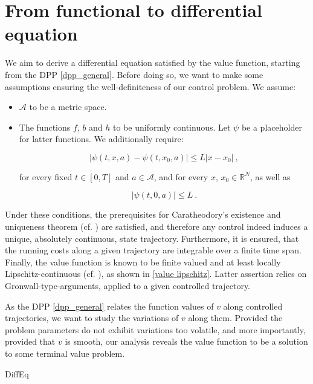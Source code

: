 
\section{From functional to differential equation}

We aim to derive a differential equation satisfied by the value function, starting from the DPP \eqref{dpp_general}. Before doing so, we want to make some assumptions ensuring the well-definiteness of our control problem. We assume:

	\begin{itemize}
		\item
		$ \mathcal{A} $ to be a metric space.
		
		\item The functions $ f $, $ b $ and $ h $ to be uniformly continuous. Let $ \psi $ be a placeholder for latter functions. We additionally require:
		
		\begin{equation}
			\label{Lipschitz}
			\lvert \psi(t, x, a) - \psi(t, x_0, a) \rvert \leq L \lvert x - x_0 \rvert \ ,
		\end{equation}
		
		for every fixed $ t \in \left[0, T \right] $ and $ a \in \mathcal{A} $, and for every $ x $, $ x_0 \in  \mathbb{R}^N $, as well as 
		
		\begin{equation}
			\label{bounded}
			\lvert \psi(t, 0, a) \rvert \leq L \ .
		\end{equation}
		
	\end{itemize}

Under these conditions, the prerequisites for  Caratheodory's existence and uniqueness theorem (cf. \cite[Theorem 1.45 p.~25]{roubivcek}) are satisfied, and therefore any control indeed induces a unique, absolutely continuous, state trajectory. Furthermore, it is ensured, that the running costs along a given trajectory are integrable over a finite time span. Finally, the value function is known to be finite valued and at least locally Lipschitz-continuous (cf. \cite[Inequality (2.36) from Theorem 2.5 p.~165]{zhou}), as shown in \ref{value lipschitz}. Latter assertion relies on Gronwall-type-arguments, applied to a given controlled trajectory.

As the DPP \eqref{dpp_general} relates the function values of $ v $ along controlled trajectories, we want to study the variations of $ v $ along them. Provided the problem parameters do not exhibit variations too volatile, and more importantly, provided that $ v $ is smooth, our analysis reveals the value  function to be a solution to some terminal value problem.

	{DiffEq}
